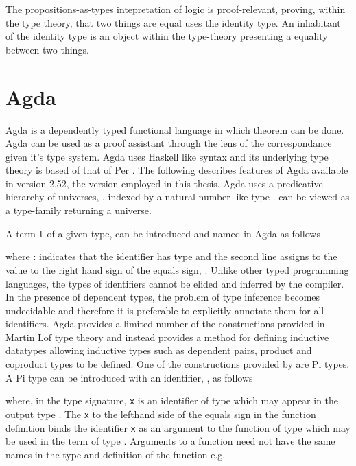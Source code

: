 The propositions-as-types intepretation of logic is
proof-relevant, proving, within the type theory, that two things are equal uses
the identity type. An inhabitant of the identity type is an object within the
type-theory presenting a equality between two things.


\section{Agda}

Agda is a dependently typed functional language in which theorem can be done.
Agda can be used as a proof assistant through the lens of the \cuho{}
correspondance given it's type system. Agda uses Haskell like syntax and its
underlying type theory is based of that of Per \mlt. The following
describes features of Agda available in version 2.52, the version employed in
this thesis. Agda uses a predicative hierarchy of universes,
, indexed by a natural-number like type
.  can be viewed as a type-family
returning a universe.

A term \verb|t| of a given type,  can be introduced and named
in Agda as follows



where  :  indicates that the identifier
 has type  and the second line assigns to
 the value to the right hand sign of the equals sign,
. Unlike other typed programming languages, the types of
identifiers cannot be elided and inferred by the compiler. In the presence of
dependent types, the problem of type inference becomes undecidable and therefore
it is preferable to explicitly annotate them for all identifiers. Agda provides
a limited number of the constructions provided in Martin Lof type theory and
instead provides a method for defining inductive datatypes allowing inductive
types such as dependent pairs, product and coproduct types to be defined. One of
the constructions provided by are Pi types. A Pi type can be introduced with an
identifier, , as follows


where, in the type signature, \verb|x| is an identifier of type 
which may appear in the output type . The \verb|x| to the
lefthand side of the equals sign in the function definition binds the identifier
\verb|x| as an argument to the function of type  which may be
used in the term  of type . Arguments to a
function need not have the same names in the type and definition of the function
e.g.

